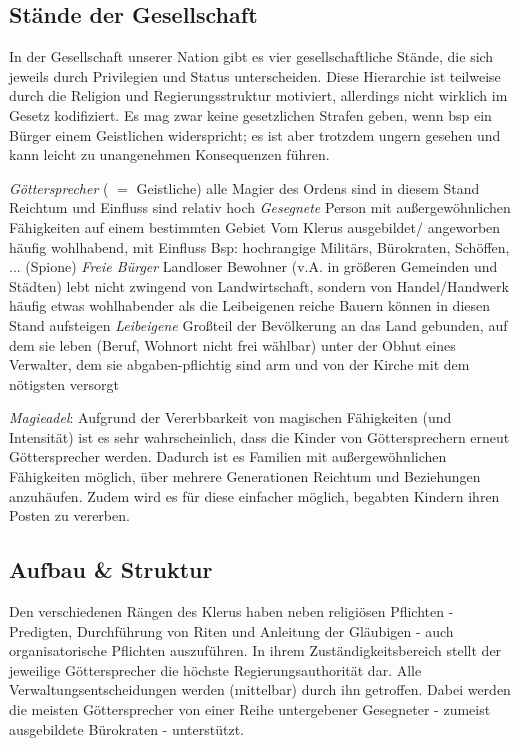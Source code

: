\subsection{Stände der Gesellschaft}\label{ch:staende}
In der Gesellschaft unserer Nation gibt es vier gesellschaftliche Stände, die sich jeweils durch Privilegien und Status unterscheiden. 
Diese Hierarchie ist teilweise durch die Religion und Regierungsstruktur motiviert, allerdings nicht wirklich im Gesetz kodifiziert. Es mag zwar keine gesetzlichen Strafen geben, 
wenn bsp ein Bürger einem Geistlichen widerspricht; es ist aber trotzdem ungern gesehen und kann leicht zu unangenehmen Konsequenzen führen.
\begin{outline}
	\1 \emph{Göttersprecher} ( $=$ Geistliche)
		\2 alle Magier des Ordens sind in diesem Stand
		\2 Reichtum und Einfluss sind relativ hoch 
	\1 \emph{Gesegnete}
		\2 Person mit außergewöhnlichen Fähigkeiten auf einem bestimmten Gebiet
		\2 Vom Klerus ausgebildet/ angeworben
		\2 häufig wohlhabend, mit Einfluss
		\2 Bsp: hochrangige Militärs, Bürokraten, Schöffen,  ... (Spione)
	\1 \emph{Freie Bürger}
		\2 Landloser Bewohner (v.A. in größeren Gemeinden und Städten)
		\2 lebt nicht zwingend von Landwirtschaft, sondern von Handel/Handwerk
		\2 häufig etwas wohlhabender als die Leibeigenen
		\2 reiche Bauern können in diesen Stand aufsteigen
	\1 \emph{Leibeigene}
		\2 Großteil der Bevölkerung
		\2 an das Land gebunden, auf dem sie leben (Beruf, Wohnort nicht frei wählbar)
		\2 unter der Obhut eines Verwalter, dem sie abgaben-pflichtig sind
		\2 arm und von der Kirche mit dem nötigsten versorgt
\end{outline}

\emph{Magieadel}: Aufgrund der Vererbbarkeit von magischen Fähigkeiten (und Intensität) ist es sehr wahrscheinlich, dass die Kinder von Göttersprechern erneut Göttersprecher werden. 
Dadurch ist es Familien mit außergewöhnlichen Fähigkeiten möglich, über mehrere Generationen Reichtum und Beziehungen anzuhäufen. 
Zudem wird es für diese einfacher möglich, begabten Kindern ihren Posten zu vererben.



\subsection{Aufbau \& Struktur}
Den verschiedenen Rängen des Klerus haben neben religiösen Pflichten - Predigten, Durchführung von Riten und Anleitung der Gläubigen - auch organisatorische Pflichten auszuführen. 
In ihrem Zuständigkeitsbereich stellt der jeweilige Göttersprecher die höchste Regierungsauthorität dar. 
Alle Verwaltungsentscheidungen werden (mittelbar) durch ihn getroffen.
Dabei werden die meisten Göttersprecher von einer Reihe untergebener Gesegneter - zumeist ausgebildete Bürokraten - unterstützt.

